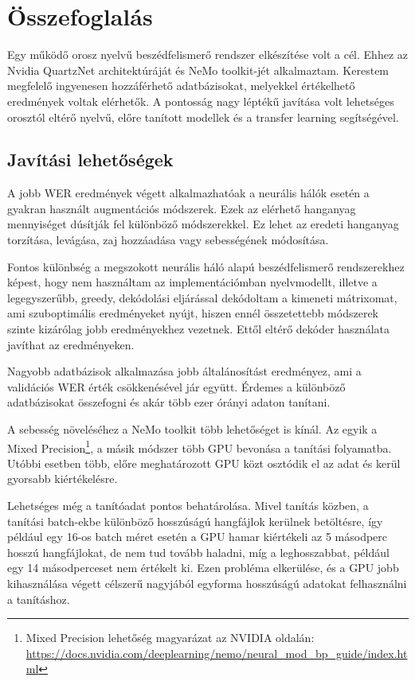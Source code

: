 \chapter{Összefoglalás}

Egy működő orosz nyelvű beszédfelismerő rendszer elkészítése volt a cél. Ehhez az Nvidia QuartzNet architektúráját és NeMo toolkit-jét alkalmaztam. Kerestem megfelelő ingyenesen hozzáférhető adatbázisokat, melyekkel értékelhető eredmények voltak elérhetők. A pontosság nagy léptékű javítása volt lehetséges orosztól eltérő nyelvű, előre tanított modellek és a transfer learning segítségével.

\section{Javítási lehetőségek}

A jobb WER eredmények végett alkalmazhatóak a neurális hálók esetén a gyakran használt augmentációs módszerek. Ezek az elérhető hanganyag mennyiséget dúsítják fel különböző módszerekkel. Ez lehet az eredeti hanganyag torzítása, levágása, zaj hozzáadása vagy sebességének módosítása.

Fontos különbség a megszokott neurális háló alapú beszédfelismerő rendszerekhez képest, hogy nem használtam az implementációmban nyelvmodellt, illetve a legegyszerűbb, greedy, dekódolási eljárással dekódoltam a kimeneti mátrixomat, ami szuboptimális eredményeket nyújt, hiszen ennél összetettebb módszerek szinte kizárólag jobb eredményekhez vezetnek\cite{decoder}. Ettől eltérő dekóder használata javíthat az eredményeken.

Nagyobb adatbázisok alkalmazása jobb általánosítást eredményez, ami a validációs WER érték csökkenésével jár együtt. Érdemes a különböző adatbázisokat összefogni és akár több ezer órányi adaton tanítani.

A sebesség növeléséhez a NeMo toolkit több lehetőséget is kínál. Az egyik a Mixed Precision\footnote{Mixed Precision lehetőség magyarázat az NVIDIA oldalán: \url{https://docs.nvidia.com/deeplearning/nemo/neural_mod_bp_guide/index.html}}, a másik módszer több GPU bevonása a tanítási folyamatba. Utóbbi esetben több, előre meghatározott GPU közt osztódik el az adat és kerül gyorsabb kiértékelésre.

Lehetséges még a tanítóadat pontos behatárolása. Mivel tanítás közben, a tanítási batch-ekbe különböző hosszúságú hangfájlok kerülnek betöltésre, így például egy 16-os batch méret esetén a GPU hamar kiértékeli az 5 másodperc hosszú hangfájlokat, de nem tud tovább haladni, míg a leghosszabbat, például egy 14 másodperceset nem értékelt ki. Ezen probléma elkerülése, és a GPU jobb kihasználása végett célszerű nagyjából egyforma hosszúságú adatokat felhasználni a tanításhoz.

